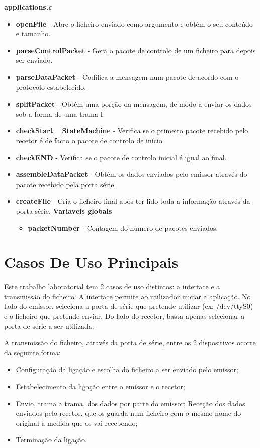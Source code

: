 \documentclass{article}
\begin{document}
\textbf{applications.c}
\begin{itemize}
	\item \textbf{openFile} - Abre o ficheiro enviado como argumento e obtém o seu conteúdo e tamanho.
	\item \textbf{parseControlPacket} -  Gera o pacote de controlo de um ficheiro para depois ser enviado.
	\item \textbf{parseDataPacket} - Codifica a mensagem num pacote de acordo com o protocolo estabelecido.
	\item \textbf{splitPacket} - Obtém uma porção da mensagem, de modo a enviar os dados sob a forma de uma trama I.
	\item \textbf{checkStart \_StateMachine} - Verifica se o primeiro pacote recebido pelo recetor é de facto o pacote de controlo de início.
	\item \textbf{checkEND} - Verifica se o pacote de controlo inicial é igual ao final.
	\item \textbf{assembleDataPacket} - Obtém os dados enviados pelo emissor através do pacote recebido pela porta série.
	\item \textbf{createFile} - Cria o ficheiro final após ter lido toda a informação através da porta série.
	\textbf{Variaveis globais}
	\begin{itemize}
		\item \textbf{packetNumber} - Contagem do número de pacotes enviados.
	\end{itemize}
\end{itemize}


\section{Casos De Uso Principais}

Este trabalho laboratorial tem 2 casos de uso distintos: a interface e a transmissão do ficheiro.
A interface permite ao utilizador iniciar a aplicação. No lado do emissor, seleciona a porta de série que pretende utilizar (ex: /dev/ttyS0) e o ficheiro que pretende enviar. Do lado do recetor, basta apenas selecionar a porta de série a ser utilizada.

A transmissão do ficheiro, através da porta de série, entre os 2 dispositivos ocorre da seguinte forma:

\begin{itemize}
	\item Configuração da ligação e escolha do ficheiro a ser enviado pelo emissor;
	\item Estabelecimento da ligação entre o emissor e o recetor;
	\item Envio, trama a trama, dos dados por parte do emissor;
	Receção dos dados enviados pelo recetor, que os guarda num ficheiro com o mesmo nome do original à medida que os vai recebendo;
	\item Terminação da ligação.

\end{itemize}
\end{document}
